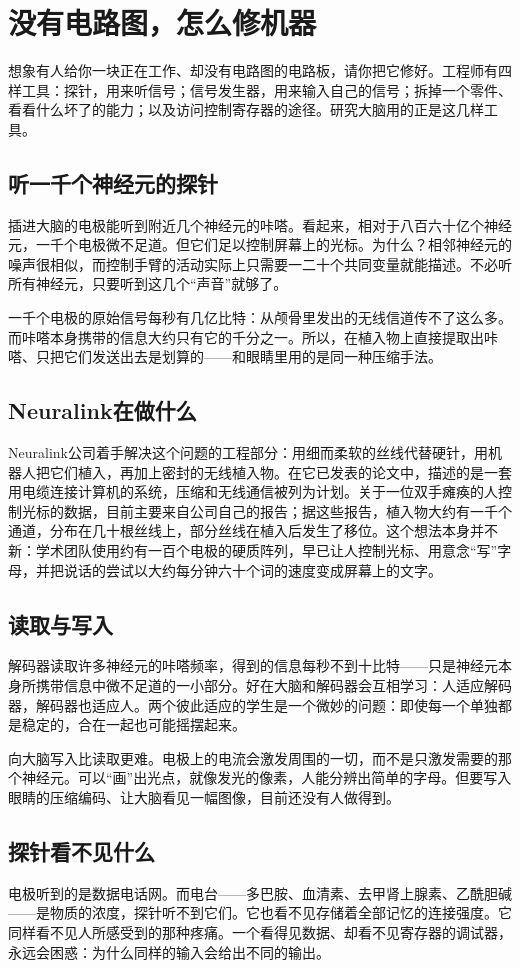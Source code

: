 \chapter{没有电路图，怎么修机器}


想象有人给你一块正在工作、却没有电路图的电路板，请你把它修好。工程师有四样工具：探针，用来听信号；信号发生器，用来输入自己的信号；拆掉一个零件、看看什么坏了的能力；以及访问控制寄存器的途径。研究大脑用的正是这几样工具。

\section*{听一千个神经元的探针}

插进大脑的电极能听到附近几个神经元的咔嗒。看起来，相对于八百六十亿个神经元，一千个电极微不足道。但它们足以控制屏幕上的光标。为什么？相邻神经元的噪声很相似，而控制手臂的活动实际上只需要一二十个共同变量就能描述。不必听所有神经元，只要听到这几个“声音”就够了。

一千个电极的原始信号每秒有几亿比特：从颅骨里发出的无线信道传不了这么多。而咔嗒本身携带的信息大约只有它的千分之一。所以，在植入物上直接提取出咔嗒、只把它们发送出去是划算的——和眼睛里用的是同一种压缩手法。

\section*{Neuralink在做什么}

Neuralink公司着手解决这个问题的工程部分：用细而柔软的丝线代替硬针，用机器人把它们植入，再加上密封的无线植入物。在它已发表的论文中，描述的是一套用电缆连接计算机的系统，压缩和无线通信被列为计划。关于一位双手瘫痪的人控制光标的数据，目前主要来自公司自己的报告；据这些报告，植入物大约有一千个通道，分布在几十根丝线上，部分丝线在植入后发生了移位。这个想法本身并不新：学术团队使用约有一百个电极的硬质阵列，早已让人控制光标、用意念“写”字母，并把说话的尝试以大约每分钟六十个词的速度变成屏幕上的文字。

\section*{读取与写入}

解码器读取许多神经元的咔嗒频率，得到的信息每秒不到十比特——只是神经元本身所携带信息中微不足道的一小部分。好在大脑和解码器会互相学习：人适应解码器，解码器也适应人。两个彼此适应的学生是一个微妙的问题：即使每一个单独都是稳定的，合在一起也可能摇摆起来。

向大脑写入比读取更难。电极上的电流会激发周围的一切，而不是只激发需要的那个神经元。可以“画”出光点，就像发光的像素，人能分辨出简单的字母。但要写入眼睛的压缩编码、让大脑看见一幅图像，目前还没有人做得到。

\section*{探针看不见什么}

电极听到的是数据电话网。而电台——多巴胺、血清素、去甲肾上腺素、乙酰胆碱——是物质的浓度，探针听不到它们。它也看不见存储着全部记忆的连接强度。它同样看不见人所感受到的那种疼痛。一个看得见数据、却看不见寄存器的调试器，永远会困惑：为什么同样的输入会给出不同的输出。

